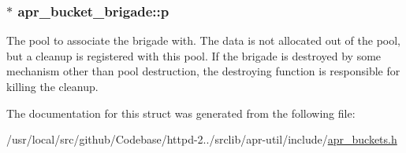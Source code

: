 \subsubsection[{\texorpdfstring{p}{p}}]{$\ast$ apr\+\_\+bucket\+\_\+brigade\+::p}\hypertarget{structapr__bucket__brigade_a8e03b4dd531903709ae3ae8ebe9e46ee}{}\label{structapr__bucket__brigade_a8e03b4dd531903709ae3ae8ebe9e46ee}
The pool to associate the brigade with. The data is not allocated out of the pool, but a cleanup is registered with this pool. If the brigade is destroyed by some mechanism other than pool destruction, the destroying function is responsible for killing the cleanup. 

The documentation for this struct was generated from the following file\+:\begin{DoxyCompactItemize}
\item 
/usr/local/src/github/\+Codebase/httpd-\/2../srclib/apr-\/util/include/\hyperlink{apr__buckets_8h}{apr\+\_\+buckets.\+h}\end{DoxyCompactItemize}
